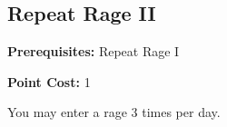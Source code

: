 \subsection{Repeat Rage II}\label{feat:repeatrage2}

\noindent
\textbf{Prerequisites:} Repeat Rage I

\noindent
\textbf{Point Cost:} 1

You may enter a rage 3 times per day.
